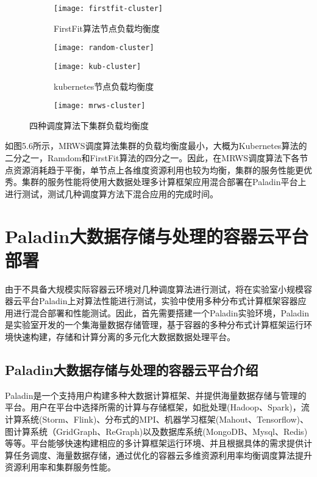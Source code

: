 \begin{figure}[H]
	\centering%
	\begin{subfigure}{7cm}
		\texttt{[image: firstfit-cluster]}
		\caption{FirstFit算法节点负载均衡度}
	\end{subfigure}%
	\hspace{0.5cm}%
	\begin{subfigure}{7cm}
		\texttt{[image: random-cluster]}
	\end{subfigure}
	\begin{subfigure}{7cm}
		\texttt{[image: kub-cluster]}
		\caption{kubernetes节点负载均衡度}
	\end{subfigure}%
	\hspace{0.5cm}%
	\begin{subfigure}{7cm}
		\texttt{[image: mrws-cluster]}
	\end{subfigure}
	\caption{四种调度算法下集群负载均衡度}	
\end{figure}

如图5.6所示，MRWS调度算法集群的负载均衡度最小，大概为Kubernetes算法的二分之一，Ramdom和FirstFit算法的四分之一。因此，在MRWS调度算法下各节点资源消耗趋于平衡，单节点上各维度资源利用也较为均衡，集群的服务性能更优秀。集群的服务性能将使用大数据处理多计算框架应用混合部署在Paladin平台上进行测试，测试几种调度算方法下混合应用的完成时间。

\section{Paladin大数据存储与处理的容器云平台部署}
由于不具备大规模实际容器云环境对几种调度算法进行测试，将在实验室小规模容器云平台Paladin上对算法性能进行测试，实验中使用多种分布式计算框架容器应用进行混合部署和性能测试。因此，首先需要搭建一个Paladin实验环境，Paladin是实验室开发的一个集海量数据存储管理，基于容器的多种分布式计算框架运行环境快速构建，存储和计算分离的多元化大数据数据处理平台。
\subsection{Paladin大数据存储与处理的容器云平台介绍}
Paladin是一个支持用户构建多种大数据计算框架、并提供海量数据存储与管理的平台。用户在平台中选择所需的计算与存储框架，如批处理(Hadoop、Spark)，流计算系统(Storm、Flink)、分布式的MPI、机器学习框架(Mahout、Tensorflow)、图计算系统（GridGraph、ReGraph)以及数据库系统(MongoDB、Mysql、Redis)等等。平台能够快速构建相应的多计算框架运行环境、并且根据具体的需求提供计算任务调度、海量数据存储，通过优化的容器云多维资源利用率均衡调度算法提升资源利用率和集群服务性能。

